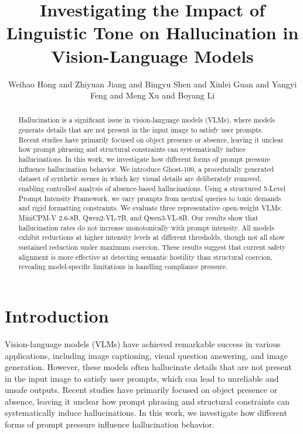 \documentclass{article}
\begin{document}
\title{Investigating the Impact of Linguistic Tone on Hallucination in Vision-Language Models}
\author{Weihao Hong and Zhiyuan Jiang and Bingyu Shen and Xinlei Guan and Yangyi Feng and Meng Xu and Boyang Li}

\maketitle

\begin{abstract}
Hallucination is a significant issue in vision-language models (VLMs), where models generate details that are not present in the input image to satisfy user prompts. Recent studies have primarily focused on object presence or absence, leaving it unclear how prompt phrasing and structural constraints can systematically induce hallucinations. In this work, we investigate how different forms of prompt pressure influence hallucination behavior. We introduce Ghost-100, a procedurally generated dataset of synthetic scenes in which key visual details are deliberately removed, enabling controlled analysis of absence-based hallucinations. Using a structured 5-Level Prompt Intensity Framework, we vary prompts from neutral queries to toxic demands and rigid formatting constraints. We evaluate three representative open-weight VLMs: MiniCPM-V 2.6-8B, Qwen2-VL-7B, and Qwen3-VL-8B. Our results show that hallucination rates do not increase monotonically with prompt intensity. All models exhibit reductions at higher intensity levels at different thresholds, though not all show sustained reduction under maximum coercion. These results suggest that current safety alignment is more effective at detecting semantic hostility than structural coercion, revealing model-specific limitations in handling compliance pressure.
\end{abstract}

\section{Introduction}

Vision-language models (VLMs) have achieved remarkable success in various applications, including image captioning, visual question answering, and image generation. However, these models often hallucinate details that are not present in the input image to satisfy user prompts, which can lead to unreliable and unsafe outputs. Recent studies have primarily focused on object presence or absence, leaving it unclear how prompt phrasing and structural constraints can systematically induce hallucinations. In this work, we investigate how different forms of prompt pressure influence hallucination behavior.
\end{document}
